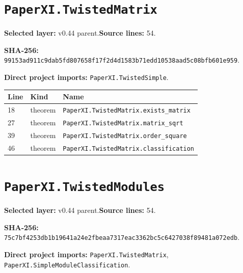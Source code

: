 \documentclass[10pt,oneside]{book}
\begin{document}
\section{\texorpdfstring{\nolinkurl{PaperXI.TwistedMatrix}}{PaperXI.TwistedMatrix}}\label{module:PaperXI.TwistedMatrix}

\textbf{Selected layer:} v0.44 parent.\quad\textbf{Source lines:} 54.\par\textbf{SHA-256:} {\scriptsize\nolinkurl{99153ad911c9dab5fd807658f17f2d4d1583b71edd10538aad5c08bfb601e959}}.


\textbf{Direct project imports:} \nolinkurl{PaperXI.TwistedSimple}.

\begin{longtable}{@{}p{}p{}p{}@{}}\toprule Line&Kind&Name\\\midrule\endhead

18&theorem&\nolinkurl{PaperXI.TwistedMatrix.exists_matrix}\\

27&theorem&\nolinkurl{PaperXI.TwistedMatrix.matrix_sqrt}\\

39&theorem&\nolinkurl{PaperXI.TwistedMatrix.order_square}\\

46&theorem&\nolinkurl{PaperXI.TwistedMatrix.classification}\\

\bottomrule\end{longtable}

\section{\texorpdfstring{\nolinkurl{PaperXI.TwistedModules}}{PaperXI.TwistedModules}}\label{module:PaperXI.TwistedModules}

\textbf{Selected layer:} v0.44 parent.\quad\textbf{Source lines:} 54.\par\textbf{SHA-256:} {\scriptsize\nolinkurl{75c7bf4253db1b19641a24e2fbeaa7317eac3362bc5c6427038f89481a072edb}}.


\textbf{Direct project imports:} \nolinkurl{PaperXI.TwistedMatrix}, \nolinkurl{PaperXI.SimpleModuleClassification}.
\end{document}
